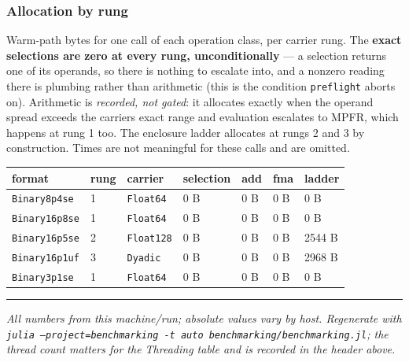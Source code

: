 \subsubsection{Allocation by rung}



\label{9989398019819587694}{}


Warm-path bytes for one call of each operation class, per carrier rung. The \textbf{exact selections are zero at every rung, unconditionally} — a selection returns one of its operands, so there is nothing to escalate into, and a nonzero reading there is plumbing rather than arithmetic (this is the condition \texttt{preflight} aborts on). Arithmetic is \emph{recorded, not gated}: it allocates exactly when the operand spread exceeds the carrier{\textquotesingle}s exact range and evaluation escalates to MPFR, which happens at rung 1 too. The enclosure ladder allocates at rungs 2 and 3 by construction. Times are not meaningful for these calls and are omitted.




\begin{table}[h]
\centering
\begin{tabulary}{\linewidth}{L L L L L L L}
\toprule
format & rung & carrier & selection & add & fma & ladder \\
\toprule
\texttt{Binary8p4se} & 1 & \texttt{Float64} & 0 B & 0 B & 0 B & 0 B \\
\texttt{Binary16p8se} & 1 & \texttt{Float64} & 0 B & 0 B & 0 B & 0 B \\
\texttt{Binary16p5se} & 2 & \texttt{Float128} & 0 B & 0 B & 0 B & 2544 B \\
\texttt{Binary16p1uf} & 3 & \texttt{Dyadic} & 0 B & 0 B & 0 B & 2968 B \\
\texttt{Binary3p1se} & 1 & \texttt{Float64} & 0 B & 0 B & 0 B & 0 B \\
\bottomrule
\end{tabulary}

\end{table}



{\rule{\textwidth}{1pt}}


\emph{All numbers from this machine/run; absolute values vary by host. Regenerate with \texttt{julia --project=benchmarking -t auto benchmarking/\allowbreak{}benchmarking.jl}; the thread count matters for the Threading table and is recorded in the header above.}



